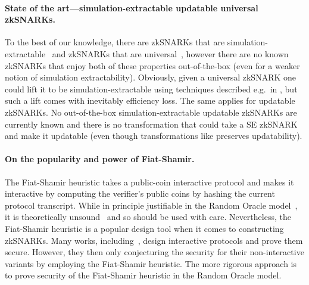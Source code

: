 \documentclass[runningheads,11pt]{llncs}
\theoremstyle{definition} \newtheorem{definition}[theorem]{Definition}
\begin{document}
\paragraph{State of the art---simulation-extractable updatable universal zkSNARKs.} 
To the best of our knowledge, there are zkSNARKs that are
simulation-extractable~\cite{C:GroMal17,EPRINT:BowGab18,EPRINT:AtaBag19,EC:Groth16}
and zkSNARKs that are
universal~\cite{C:GKMMM18,CCS:MBKM19,EPRINT:GabWilCio19,EC:CHMMVW20}, however
there are no known zkSNARKs that enjoy both of these properties out-of-the-box
(even for a weaker notion of simulation extractability). Obviously, given a
universal zkSNARK one could lift it to be simulation-extractable using
techniques described e.g.~in \cite{EPRINT:KZMQCP15,CCS:AbdRamSla20}, but such a
lift comes with inevitably efficiency loss.
The same applies for updatable zkSNARKs. No out-of-the-box
simulation-extractable updatable zkSNARKs are
currently known and there is no transformation that could take a SE zkSNARK
and make it updatable (even though transformations like \cite{CCS:AbdRamSla20}
preserves updatability).

\paragraph{On the popularity and power of Fiat-Shamir.} The Fiat-Shamir
heuristic takes a public-coin interactive protocol and makes it interactive by
computing the verifier's public coins by hashing the current protocol
transcript. While in principle justifiable in the Random Oracle
model~\cite{CCS:BelRog93}, it is theoretically unsound~\cite{FOCS:GolKal03} and
so should be used with care.  Nevertheless, the Fiat-Shamir heuristic is a
popular design tool when it comes to constructing zkSNARKs. Many works,
including~\cite{CCS:MBKM19,EPRINT:GabWilCio19,EC:CHMMVW20}, design interactive
protocols and prove them secure. However, they then only conjecturing the
security for their non-interactive variants by employing the Fiat-Shamir
heuristic. The more rigorous approach is to prove security of the Fiat-Shamir
heuristic in the Random Oracle model.
\end{document}
